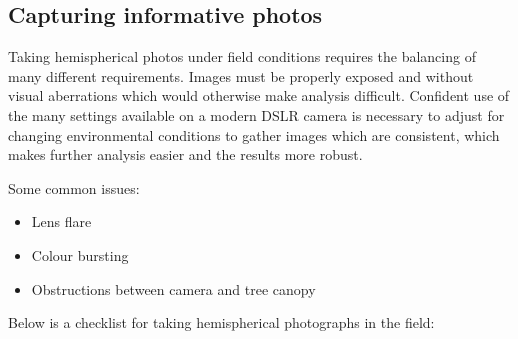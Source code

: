\documentclass{article}
\begin{document}
\subsection{Capturing informative photos}

Taking hemispherical photos under field conditions requires the balancing of many different requirements. Images must be properly exposed and without visual aberrations which would otherwise make analysis difficult. Confident use of the many settings available on a modern DSLR camera is necessary to adjust for changing environmental conditions to gather images which are consistent, which makes further analysis easier and the results more robust.

Some common issues:

\begin{itemize}
	\item{Lens flare}
	\item{Colour bursting}
	\item{Obstructions between camera and tree canopy}
\end{itemize}

Below is a checklist for taking hemispherical photographs in the field:
\end{document}
